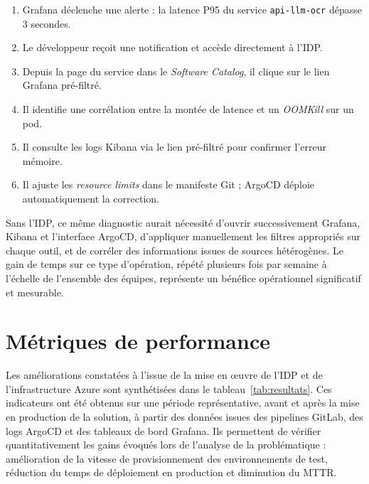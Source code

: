 \begin{enumerate}
  \item Grafana déclenche une alerte : la latence P95 du service \texttt{api-llm-ocr} dépasse 3 secondes.
  \item Le développeur reçoit une notification et accède directement à l'\ac{IDP}.
  \item Depuis la page du service dans le \textit{Software Catalog}, il clique sur le lien Grafana pré-filtré.
  \item Il identifie une corrélation entre la montée de latence et un \textit{OOMKill} sur un pod.
  \item Il consulte les logs Kibana via le lien pré-filtré pour confirmer l'erreur mémoire.
  \item Il ajuste les \textit{resource limits} dans le manifeste Git ; ArgoCD déploie automatiquement la correction.
\end{enumerate}

\noindent Sans l'\ac{IDP}, ce même diagnostic aurait nécessité d'ouvrir successivement Grafana, Kibana et l'interface ArgoCD, d'appliquer manuellement les filtres appropriés sur chaque outil, et de corréler des informations issues de sources hétérogènes. Le gain de temps sur ce type d'opération, répété plusieurs fois par semaine à l'échelle de l'ensemble des équipes, représente un bénéfice opérationnel significatif et mesurable.

\section{Métriques de performance}
\label{sec:resultats}

\noindent Les améliorations constatées à l'issue de la mise en œuvre de l'\ac{IDP} et de l'infrastructure Azure sont synthétisées dans le tableau~\ref{tab:resultats}. Ces indicateurs ont été obtenus sur une période représentative, avant et après la mise en production de la solution, à partir des données issues des pipelines GitLab, des logs ArgoCD et des tableaux de bord Grafana. Ils permettent de vérifier quantitativement les gains évoqués lors de l'analyse de la problématique : amélioration de la vitesse de provisionnement des environnements de test, réduction du temps de déploiement en production et diminution du \ac{MTTR}.


